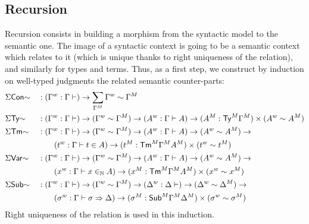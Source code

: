 \subsection{Recursion}
Recursion consists in building a morphism from the syntactic model to the
semantic one.
The image of a syntactic context is going to be a semantic context which relates
to it (which is unique thanks to right uniqueness of the relation), and
similarly for types and terms.
Thus, as a first step, we construct by induction on well-typed judgments the
related semantic counter-parts:
  \begin{alignat*}{5}
     & \Sigma\mathsf{Con}{\sim} && :
    ({\Gamma}^w : \Gamma \vdash ) \rightarrow
    \sum_{{\Gamma}^M} {\Gamma}^w \sim {\Gamma}^M
    \\
     & \Sigma\mathsf{Ty}{\sim} && :
    ({\Gamma}^w : \Gamma \vdash ) \rightarrow
    ({\Gamma}^w\sim {\Gamma}^M) \rightarrow
    ({A}^w : \Gamma \vdash A ) \rightarrow
    ({{A}^M:{\mathsf{Ty}}^M{\Gamma}^M})\times ( {A}^w \sim {A}^M)
    \\
     & \Sigma\mathsf{Tm}{\sim} && :
    ({\Gamma}^w : \Gamma \vdash ) \rightarrow
    ({\Gamma}^w\sim {\Gamma}^M) \rightarrow
    ({A}^w : \Gamma \vdash A ) \rightarrow
    ( {A}^w \sim {A}^M) \rightarrow
    \\ & && \qquad
    ({t}^w : \Gamma \vdash t \in A ) \rightarrow
    ({{t}^M:{\mathsf{Tm}}^M{\Gamma}^M}{A}^M)\times ( {t}^w \sim {t}^M)
    \\
     & \Sigma\mathsf{Var}{\sim} && :
    ({\Gamma}^w : \Gamma \vdash ) \rightarrow
    ({\Gamma}^w\sim {\Gamma}^M) \rightarrow
    ({A}^w : \Gamma \vdash A ) \rightarrow
    ( {A}^w \sim {A}^M) \rightarrow
    \\ & && \qquad
    ({x}^w : \Gamma \vdash x \in_{\mathbb{N}} A ) \rightarrow
    ({{x}^M:{\mathsf{Tm}}^M{\Gamma}^M}{A}^M)\times ( {x}^w \sim {x}^M)
    \\
     & \Sigma\mathsf{Sub}{\sim} && :
    ({\Gamma}^w : \Gamma \vdash ) \rightarrow
    ({\Gamma}^w\sim {\Gamma}^M) \rightarrow
    ({\Delta}^w : \Delta \vdash  ) \rightarrow
    ( {\Delta}^w \sim {\Delta}^M) \rightarrow
    \\ & && \qquad
    ({\sigma}^w : \Gamma \vdash \sigma \Rightarrow \Delta ) \rightarrow
    ({{\sigma}^M:{\mathsf{Sub}}^M{\Gamma}^M}{\Delta}^M)\times ( {\sigma}^w \sim {\sigma}^M)
  \end{alignat*}
  Right uniqueness of the relation is used in this induction.

